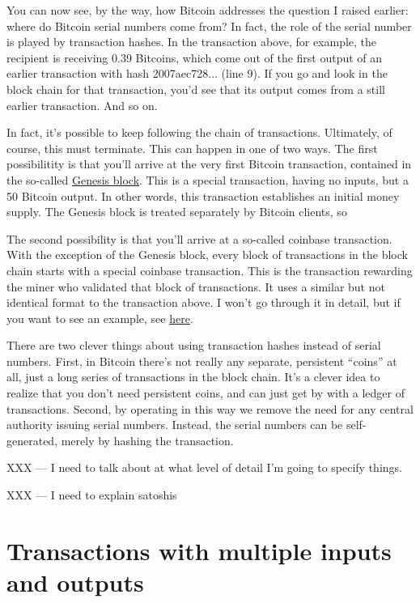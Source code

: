 \documentclass[12pt]{book}
\newcommand{\link}[2]{\href{#1}{#2}}
\newcounter{example}[chapter]
\begin{document}
You can now see, by the way, how Bitcoin addresses the question I
raised earlier: where do Bitcoin serial numbers come from?  In fact,
the role of the serial number is played by transaction hashes.  In the
transaction above, for example, the recipient is receiving 0.39
Bitcoins, which come out of the first output of an earlier transaction
with hash 2007aec728$\ldots$ (line 9).  If you go and look in the
block chain for that transaction, you'd see that its output comes from
a still earlier transaction.  And so on.  

In fact, it's possible to keep following the chain of transactions.
Ultimately, of course, this must terminate.  This can happen in one of
two ways.  The first possibilitity is that you'll arrive at the very
first Bitcoin transaction, contained in the so-called
\link{https://en.bitcoin.it/wiki/Genesis_block}{Genesis block}.  This
is a special transaction, having no inputs, but a 50 Bitcoin output.
In other words, this transaction establishes an initial money supply.
The Genesis block is treated separately by Bitcoin clients, so

The second possibility is that you'll arrive at a so-called coinbase
transaction.  With the exception of the Genesis block, every block of
transactions in the block chain starts with a special coinbase
transaction.  This is the transaction rewarding the miner who
validated that block of transactions.  It uses a similar but not
identical format to the transaction above.  I won't go through it in
detail, but if you want to see an example, see
\link{http://blockexplorer.com/rawtx/c3facb1e90fdbaf0ee59e342a00e1c82588af138784fabad7398eb9dab3a0e5a}{here}.

There are two clever things about using transaction hashes instead of
serial numbers.  First, in Bitcoin there's not really any separate,
persistent ``coins'' at all, just a long series of transactions in the
block chain.  It's a clever idea to realize that you don't need
persistent coins, and can just get by with a ledger of transactions.
Second, by operating in this way we remove the need for any central
authority issuing serial numbers.  Instead, the serial numbers can be
self-generated, merely by hashing the transaction.

XXX --- I need to talk about at what level of detail I'm going to
specify things.

XXX --- I need to explain satoshis

\section{Transactions with multiple inputs and outputs}
\end{document}
